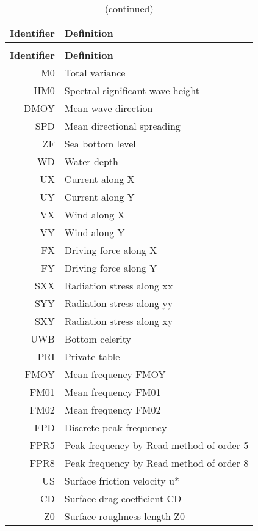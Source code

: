 \begin{longtable}{rl}
\caption{List of 2D results variables}
\label{tab:resultvar}
\\
%
\toprule
\toprule
\textbf{Identifier} & \textbf{Definition} \\
\midrule
%
\endfirsthead
\caption{(continued)}\\
%
\toprule
\toprule
\textbf{Identifier} & \textbf{Definition} \\
\midrule
%
\endhead
\bottomrule
\bottomrule
%
\endfoot
%
M0 &  Total variance \\
HM0  &  Spectral significant wave height  \\
DMOY  &  Mean wave direction  \\
SPD  &  Mean directional spreading  \\
ZF &  Sea bottom level  \\
WD &  Water depth  \\
UX &  Current along X  \\
UY &  Current along Y  \\
VX &  Wind along X  \\
VY &  Wind along Y  \\
FX &  Driving force along X  \\
FY &  Driving force along Y  \\
SXX  &  Radiation stress along xx  \\
SYY  &  Radiation stress along yy  \\
SXY  &  Radiation stress along xy  \\
UWB  &  Bottom celerity  \\
PRI  &  Private table  \\
FMOY  &  Mean frequency FMOY  \\
FM01  &  Mean frequency FM01  \\
FM02  &  Mean frequency FM02  \\
FPD  &  Discrete peak frequency  \\
FPR5  &  Peak frequency by Read method of order 5  \\
FPR8  &  Peak frequency by Read method of order 8  \\
US &  Surface friction velocity u*  \\
CD &  Surface drag coefficient CD  \\
Z0 &  Surface roughness length Z0  \\

\end{longtable}
